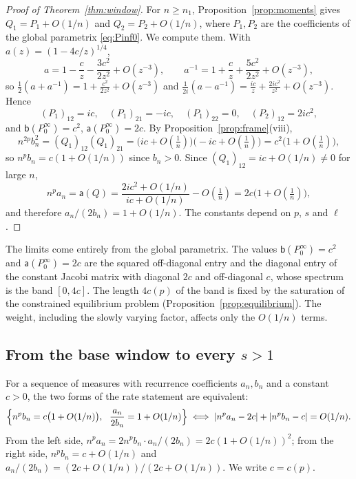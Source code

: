 \begin{proof}[Proof of Theorem~\ref{thm:window}]
For $n\ge n_1$, Proposition~\ref{prop:moments} gives $Q_1=P_1+O(1/n)$ and $Q_2=P_2+O(1/n)$, where $P_1,P_2$ are the
coefficients of the global parametrix \eqref{eq:Pinf0}. We compute them. With $a(z)=(1-4c/z)^{1/4}$,
\[
  a=1-\frac cz-\frac{3c^2}{2z^2}+O(z^{-3}),\qquad a^{-1}=1+\frac cz+\frac{5c^2}{2z^2}+O(z^{-3}),
\]
so $\frac12(a+a^{-1})=1+\frac{c^2}{2z^2}+O(z^{-3})$ and $\frac1{2i}(a-a^{-1})=\frac{ic}z+\frac{2ic^2}{z^2}+O(z^{-3})$.
Hence
\[
  (P_1)_{12}=ic,\quad (P_1)_{21}=-ic,\quad (P_1)_{22}=0,\quad (P_2)_{12}=2ic^2,
\]
and $\mathsf b(P^\infty_0)=c^2$, $\mathsf a(P^\infty_0)=2c$. By Proposition~\ref{prop:frame}(viii),
\[
  n^{2p}b_n^2=(Q_1)_{12}(Q_1)_{21}=\bigl(ic+O(\tfrac1n)\bigr)\bigl(-ic+O(\tfrac1n)\bigr)=c^2\bigl(1+O(\tfrac1n)\bigr),
\]
so $n^pb_n=c(1+O(1/n))$ since $b_n>0$. Since $(Q_1)_{12}=ic+O(1/n)\ne0$ for large $n$,
\[
  n^pa_n=\mathsf a(Q)=\frac{2ic^2+O(1/n)}{ic+O(1/n)}-O(\tfrac1n)=2c\bigl(1+O(\tfrac1n)\bigr),
\]
and therefore $a_n/(2b_n)=1+O(1/n)$. The constants depend on $p$, $s$ and $\ell$.
\end{proof}

The limits come entirely from the global parametrix. The values $\mathsf b(P^\infty_0)=c^2$ and $\mathsf
a(P^\infty_0)=2c$ are the squared off-diagonal entry and the diagonal entry of the constant Jacobi matrix with diagonal
$2c$ and off-diagonal $c$, whose spectrum is the band $[0,4c]$. The length $4c(p)$ of the band is fixed by the
saturation of the constrained equilibrium problem (Proposition~\ref{prop:equilibrium}). The weight, including the
slowly varying factor, affects only the $O(1/n)$ terms.

\subsection{From the base window to every \texorpdfstring{$s>1$}{s>1}}\label{sec:assembly}

For a sequence of measures with recurrence coefficients $a_n,b_n$ and a constant $c>0$, the two forms of the rate
statement are equivalent:
\begin{equation}\label{eq:forms}
  \Bigl\{n^pb_n=c\bigl(1+O(1/n)\bigr),\ \ \frac{a_n}{2b_n}=1+O(1/n)\Bigr\}
  \iff |n^pa_n-2c|+|n^pb_n-c|=O(1/n).
\end{equation}
From the left side, $n^pa_n=2n^pb_n\cdot a_n/(2b_n)=2c(1+O(1/n))^2$; from the right side,
$n^pb_n=c+O(1/n)$ and $a_n/(2b_n)=(2c+O(1/n))/(2c+O(1/n))$. We write $c=c(p)$.

